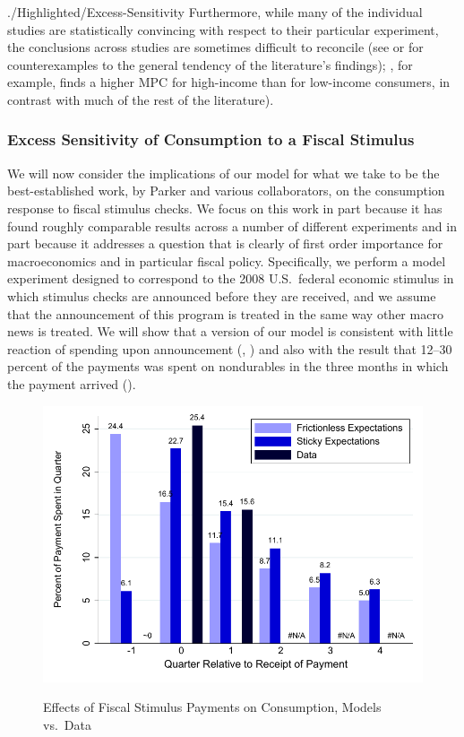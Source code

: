 \documentclass[titlepage]{./econtex}
\begin{document}
\begin{verbatimwrite}{./Highlighted/Excess-Sensitivity}
Furthermore, while many of the individual studies are statistically convincing with respect to their particular experiment, the conclusions across studies are sometimes difficult to reconcile (see \cite{hsiehAlaska} or \cite{CoulibalyLiMortgage} for counterexamples to the general tendency of the literature's findings); \cite{kuengAlaska}, for example, finds a higher MPC for high-income than for low-income consumers, in contrast with much of the rest of the literature).


\hypertarget{Excess-Sensitivity-Experiment}{}
\subsubsection{Excess Sensitivity of Consumption to a Fiscal Stimulus}

We will now consider the implications of our model for what we take to be the best-established work, by Parker and various collaborators, on the consumption response to fiscal stimulus checks. We focus on this work in part because it has found roughly comparable results across a number of different experiments and in part because it addresses a question that is clearly of first order importance for macroeconomics and in particular fiscal policy. Specifically, we perform a model experiment designed to correspond to the 2008 U.S.\ federal economic stimulus in which stimulus checks are announced before they are received, and we assume that the announcement of this program is treated in the same way other macro news is treated. We will show that a version of our model is consistent with little reaction of spending upon announcement (\cite{brodaParker}, \cite{parker25million}) and also with the result that 12--30 percent of the payments was spent on nondurables in the three months in which the payment arrived (\cite{psjmMPC2008}).


\begin{figure}
  \centering
\caption{Effects of Fiscal Stimulus Payments on Consumption, Models vs.\ Data}
\label{parker}
{ \includegraphics[width=1.0\textwidth]{./Figures/parkerExperiment}}


\end{figure}
\end{verbatimwrite}
\end{document}
